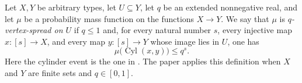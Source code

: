 \begin{definition}
Let $X,Y$ be arbitrary types, let $U\subseteq Y$, let $q$ be an extended nonnegative real, and let $\mu$ be a probability mass function on the functions $X\to Y$.  We say that $\mu$ is \emph{$q$-vertex-spread on $U$} if $q\leq1$ and, for every natural number $s$, every injective map $x:[s]\to X$, and every map $y:[s]\to Y$ whose image lies in $U$, one has
\[
 \mu\bigl(\operatorname{Cyl}(x,y)\bigr)\leq q^s.
\]
Here the cylinder event is the one in .  The paper applies this definition when $X$ and $Y$ are finite sets and $q\in[0,1]$.
\end{definition}
